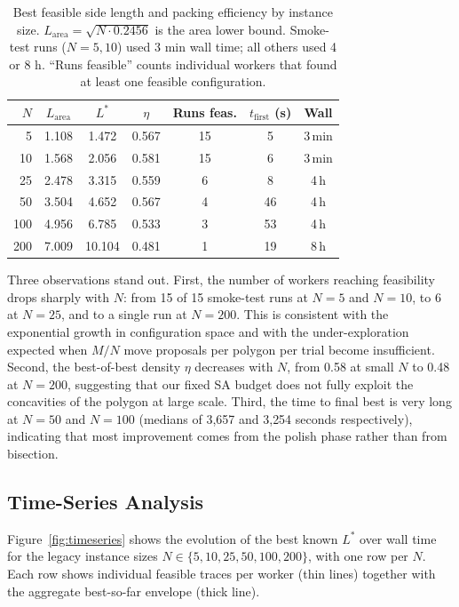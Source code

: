 \documentclass[10pt,twocolumn]{article}
\begin{document}
\begin{table}[h]
\centering
\small
\caption{Best feasible side length and packing efficiency by instance
size. $L_{\mathrm{area}} = \sqrt{N \cdot 0.2456}$ is the area lower
bound. Smoke-test runs ($N=5,10$) used 3 min wall time; all others
used 4 or 8 h. ``Runs feasible'' counts individual workers that found
at least one feasible configuration.}
\label{tab:results}
\setlength{\tabcolsep}{4pt}
\begin{tabular}{rcccccc}
\toprule
$N$ & $L_{\mathrm{area}}$ & $L^*$ & $\eta$ &
Runs feas. & $t_{\text{first}}$ (s) & Wall \\
\midrule
   5 & 1.108 & 1.472 & 0.567 & 15 &  5 & 3\,min \\
  10 & 1.568 & 2.056 & 0.581 & 15 &  6 & 3\,min \\
  25 & 2.478 & 3.315 & 0.559 &  6 &  8 & 4\,h \\
  50 & 3.504 & 4.652 & 0.567 &  4 & 46 & 4\,h \\
 100 & 4.956 & 6.785 & 0.533 &  3 & 53 & 4\,h \\
 200 & 7.009 & 10.104& 0.481 &  1 & 19 & 8\,h \\
\bottomrule
\end{tabular}
\end{table}

Three observations stand out. First, the number of workers reaching
feasibility drops sharply with $N$: from 15 of 15 smoke-test runs at
$N=5$ and $N=10$, to 6 at $N=25$, and to a single run at $N=200$.
This is consistent with the exponential growth in configuration space
and with the under-exploration expected when $M/N$ move proposals per
polygon per trial become insufficient. Second, the best-of-best density
$\eta$ decreases with $N$, from 0.58 at small $N$ to 0.48 at $N=200$,
suggesting that our fixed SA budget does not fully exploit the
concavities of the polygon at large scale. Third, the time to final
best is very long at $N = 50$ and $N = 100$ (medians of 3{,}657 and
3{,}254 seconds respectively), indicating that most improvement
comes from the polish phase rather than from bisection.

\subsection{Time-Series Analysis}

Figure~\ref{fig:timeseries} shows the evolution of the best known $L^*$
over wall time for the legacy instance sizes
$N \in \{5,10,25,50,100,200\}$, with one row per $N$. Each row shows
individual feasible traces per worker (thin lines) together with the
aggregate best-so-far envelope (thick line).
\end{document}
